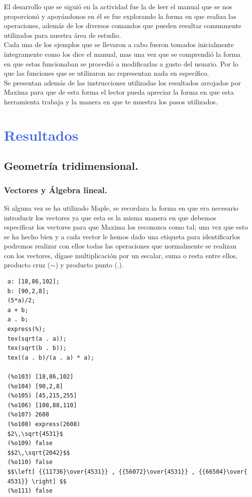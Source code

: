\documentclass[12pt]{article}
\begin{document}
 El desarrollo que se siguió en la actividad fue la de leer el manual que se nos proporcionó y apoyándonos en él se fue explorando la forma en que realiza las operaciones, además de los diversos comandos que pueden resultar comunmente utilizados para nuestra área de estudio.\\

 Cada una de los ejemplos que se llevaron a cabo fueron tomados inicialmente íntegramente como los dice el manual, mas una vez que se comprendió la forma en que estas funcionaban se procedió a modificarlas a gusto del usuario. Por lo que las funciones que se utilizaron no representan nada en específico.\\

 Se presentan además de las instrucciones utilizadas los resultados arrojados por Maxima para que de esta forma el lector pueda apreciar la forma en que esta herramienta trabaja y la manera en que te muestra los pasos utilizados.\\









\pagebreak

\section*{\textcolor{RoyalBlue}{Resultados}}
\subsection*{Geometría tridimensional.}
\subsubsection*{Vectores y Álgebra lineal.}
 Si alguna vez se ha utilizado Maple, se recordara la forma en que era necesario introducir los vectores ya que esta es la misma  manera en que debemos especificar los vectores para que Maxima los reconozca como tal; una vez que esto se ha hecho bien y a cada vector le hemos dado una etiqueta para identificarlos podremos realizar con ellos todas las operaciones que normalmente se realizan con los vectores, dígase multiplicación por un escalar, suma o resta entre ellos, producto cruz ($\sim$) y producto punto (.).\\
 \begin{verbatim}
 a: [18,86,102];
 b: [90,2,8];
 (5*a)/2;
 a + b;
 a . b;
 express(%);
 tex(sqrt(a . a));
 tex(sqrt(b . b));
 tex((a . b)/(a . a) * a);

 (%o103) [18,86,102]
 (%o104) [90,2,8]
 (%o105) [45,215,255]
 (%o106) [108,88,110]
 (%o107) 2608
 (%o108) express(2608)
 $2\,\sqrt{4531}$
 (%o109) false
 $$2\,\sqrt{2042}$$
 (%o110) false
 $$\left[ {{11736}\over{4531}} , {{56072}\over{4531}} , {{66504}\over{
 4531}} \right] $$
 (%o111) false
 \end{verbatim}
\end{document}

